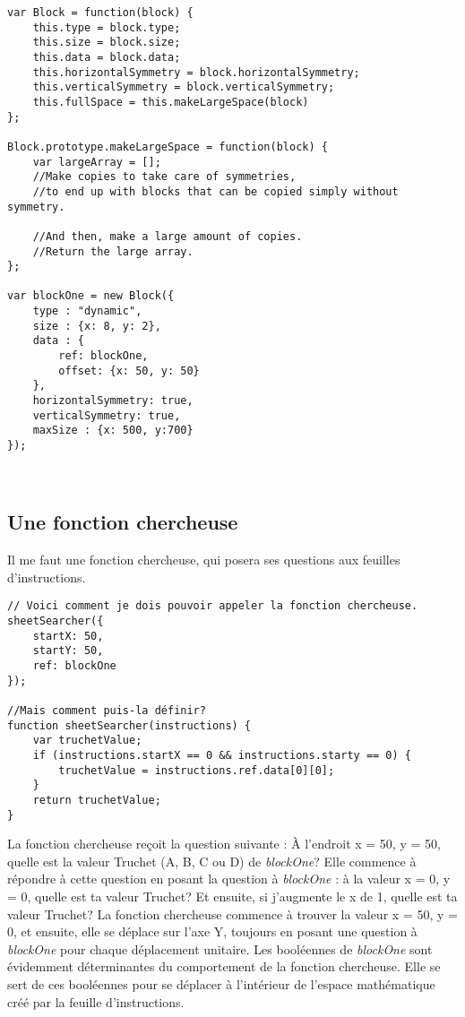 \begin{lstlisting}
var Block = function(block) {
    this.type = block.type;
    this.size = block.size;
    this.data = block.data;
    this.horizontalSymmetry = block.horizontalSymmetry;
    this.verticalSymmetry = block.verticalSymmetry;
    this.fullSpace = this.makeLargeSpace(block)
};

Block.prototype.makeLargeSpace = function(block) {
    var largeArray = [];
    //Make copies to take care of symmetries,
    //to end up with blocks that can be copied simply without symmetry.

    //And then, make a large amount of copies.
    //Return the large array.
};

var blockOne = new Block({
    type : "dynamic",
    size : {x: 8, y: 2},
    data : {
        ref: blockOne,
        offset: {x: 50, y: 50}
    },
    horizontalSymmetry: true,
    verticalSymmetry: true,
    maxSize : {x: 500, y:700}
});



\end{lstlisting}
\subsection{Une fonction chercheuse}

Il me faut une fonction chercheuse, qui posera ses questions aux feuilles d'instructions.

\begin{lstlisting}
// Voici comment je dois pouvoir appeler la fonction chercheuse.
sheetSearcher({
    startX: 50,
    startY: 50,
    ref: blockOne
});

//Mais comment puis-la définir?
function sheetSearcher(instructions) {
    var truchetValue;
    if (instructions.startX == 0 && instructions.starty == 0) {
        truchetValue = instructions.ref.data[0][0];
    }
    return truchetValue;
}
\end{lstlisting}
La fonction chercheuse reçoit la question suivante : À l'endroit x = 50, y = 50, quelle est la valeur Truchet (A, B, C ou D) de \textit{blockOne}? Elle commence à répondre à cette question en posant la question à \textit{blockOne} : à la valeur x = 0, y = 0, quelle est ta valeur Truchet? Et ensuite, si j'augmente le x de 1, quelle est ta valeur Truchet? La fonction chercheuse commence à trouver la valeur x = 50, y = 0, et ensuite, elle se déplace sur l'axe Y, toujours en posant une question à \textit{blockOne} pour chaque déplacement unitaire. Les booléennes de \textit{blockOne} sont évidemment déterminantes du comportement de la fonction chercheuse. Elle se sert de ces booléennes pour se déplacer à l'intérieur de l'espace mathématique créé par la feuille d'instructions.

